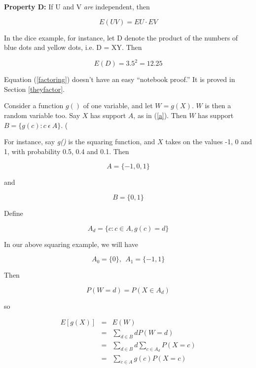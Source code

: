 {\bf Property D:} If U and V {\it are} independent, then

\begin{equation}
\label{factoring}
E(UV) = EU \cdot EV
\end{equation}


In the dice example, for instance, let D denote the product of the
numbers of blue dots and yellow dots, i.e. D = XY.  Then

\begin{equation}
E(D) = 3.5^2 = 12.25
\end{equation}

Equation (\ref{factoring}) doesn't have an easy ``notebook proof.'' It
is proved in Section \ref{theyfactor}.

Consider a function $g()$ of one variable, and let $W = g(X)$.  $W$ is then a
random variable too.  Say $X$ has support $A$, as in (\ref{a}).  Then $W$ has
support $B = \{g(c): c ~\epsilon~ A \}$.  (

For instance, say {\it g()} is the squaring function, and $X$ takes on
the values -1, 0 and 1, with probability 0.5, 0.4 and 0.1.  Then

\begin{equation}
A = \{ -1,0,1 \}
\end{equation}

and 

\begin{equation}
B = \{ 0,1 \}
\end{equation}

Define

\begin{equation}
A_d = \{c: c \in A, g(c) = d\}
\end{equation}

In our above squaring example, we will have

\begin{equation}
A_0 = \{ 0 \}, ~~ A_1 = \{ -1,1 \}
\end{equation}

Then 

\begin{equation}
P(W = d) = P(X \in A_d) 
\end{equation}

so

\begin{eqnarray}
E[g(X)] &=& E(W) \\
&=& \sum_{d \in B} d P(W = d) \\ 
&=& \sum_{d \in B} d \sum_{c \in A_d} P(X = c) \\
&=& \sum_{c \in A} g(c) P(X = c) 
\end{eqnarray}

